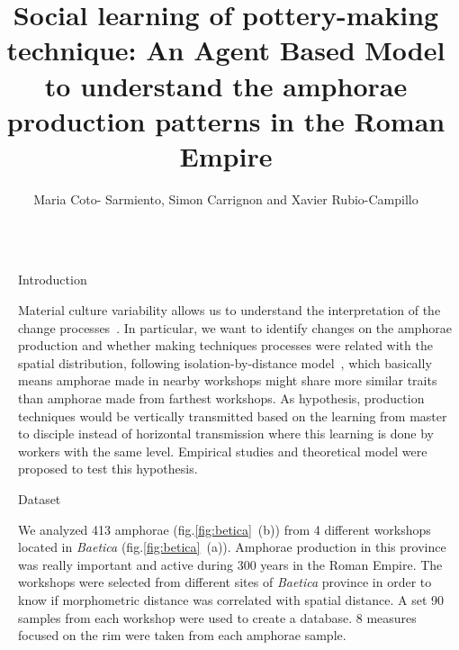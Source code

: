 \documentclass[final]{beamer}
\title{Social learning of pottery-making technique: An Agent Based Model to understand the amphorae production patterns in the Roman Empire}
\author{Maria Coto- Sarmiento, Simon Carrignon and Xavier Rubio-Campillo} %
\institute{Barcelona Supercomputing Center - University of Barcelona} %
\newlength{\sepwid}
\newlength{\onecolwid}
\begin{document}

\setlength{\belowcaptionskip}{2ex} %
\setlength\belowdisplayshortskip{2ex} %

\begin{frame}[t] %

\begin{columns}[t] %

\begin{column}{\sepwid}\end{column} %

\begin{column}{\onecolwid} %


\begin{block}{Introduction}

\justify

Material culture variability allows us to understand the interpretation of the change processes~\cite{lycett}. In particular, we want to identify changes on the amphorae production and whether making techniques processes were related with the spatial distribution, following isolation-by-distance model~\cite{bjo}, which basically means amphorae made in nearby workshops might share more similar traits than amphorae made from farthest workshops. As hypothesis, production techniques would be vertically transmitted based on the learning from master to disciple instead of horizontal transmission where this learning is done by workers with the same level. Empirical studies and theoretical model were proposed to test this hypothesis.
 
  
\end{block}


\begin{block}{Dataset}

\justify
We analyzed 413 amphorae (fig.\ref{fig:betica}~(b)) from 4 different workshops located in \emph{Baetica} (fig.\ref{fig:betica}~(a)). Amphorae production in this province was really important and active during 300 years in the Roman Empire. The workshops were selected from different sites of \emph{Baetica} province in order to know if morphometric distance was correlated with spatial distance. A set 90 samples from each workshop were used to create a database. 8 measures focused on the rim were taken from each amphorae sample. 


\end{block}
\end{column}
\end{columns}
\end{frame}
\end{document}
